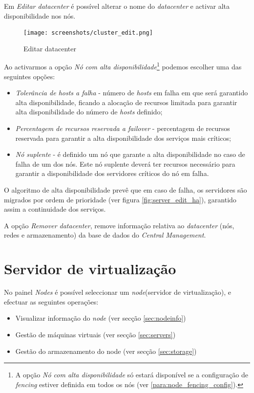 Em \emph{Editar datacenter} é possível alterar o nome do \emph{datacenter} e activar alta disponibilidade nos nós. 
\begin{figure}[H]
	\begin{center}
	\texttt{[image: screenshots/cluster\_edit.png]}
	\caption{Editar datacenter}
	\label{fig:cluster_edit}
	\end{center}
\end{figure}

Ao activarmos a opção \emph{Nó com alta disponibilidade}\footnote{A opção \emph{Nó com alta disponibilidade} só estará disponível se a configuração de \emph{fencing} estiver definida em todos os nós (ver \ref{para:node_fencing_config}).} podemos escolher uma das seguintes opções:

\begin{itemize}
    \item \emph{Tolerância de hosts a falha} - número de \emph{hosts} em falha em que será garantido alta disponibilidade, ficando a alocação de recursos limitada para garantir alta disponibilidade do número de \emph{hosts} definido;
    \item \emph{Percentagem de recursos reservada a failover} - percentagem de recursos reservada para garantir a alta disponibilidade dos serviços mais críticos;
    \item \emph{Nó suplente} - é definido um nó que garante a alta disponibilidade no caso de falha de um dos nós. Este nó suplente deverá ter recursos necessário para garantir a disponibilidade dos servidores críticos do nó em falha.
\end{itemize}

O algoritmo de alta disponibilidade prevê que em caso de falha, os servidores são migrados por ordem de prioridade (ver figura \ref{fig:server_edit_ha}), garantido assim a continuidade dos serviços.

A opção \emph{Remover datacenter}, remove informação relativa ao \emph{datacenter} (nós, redes e armazenamento) da base de dados do \emph{Central Management}.


\section{Servidor de virtualização}
\label{sec:node}

No painel \emph{Nodes} é possível seleccionar um \emph{node}(servidor de virtualização), e efectuar as seguintes operações:
\begin{itemize}
    \item Visualizar informação do \emph{node} (ver secção \ref{sec:nodeinfo})
    \item Gestão de máquinas virtuais (ver secção \ref{sec:servers})
    \item Gestão do armazenamento do node (ver secção \ref{sec:storage})
\end{itemize}

